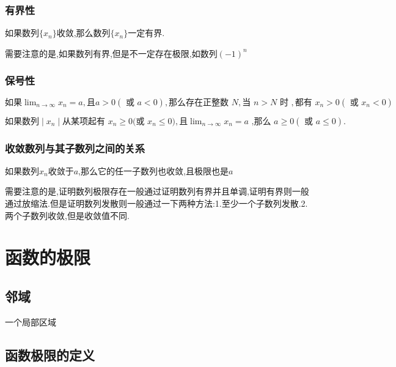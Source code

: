 \documentclass[12pt, a4paper, oneside, UTF8]{ctexbook}  %
\begin{document}
\subsubsection{有界性}
\begin{them}{}{}
    如果数列$\{x_n\}$收敛,那么数列$\{x_n\}$一定有界.
\end{them}
\begin{criterion}{}{}
    需要注意的是,如果数列有界,但是不一定存在极限,如数列$(-1)^n$
\end{criterion}
\subsubsection{保号性}
\begin{them}{}{}
    $\text{如果}\lim_{n\to\infty}x_n=a,\text{且}a{>}0(\text{ 或 }a{<}0),\text{那么存在正整数 }N,\text{当 }n{>}N\text{ 时 },\text{都有 }x_n{>}0\left(\text{ 或 }x_n{<}0\right)$
\end{them}
\begin{corollary}{}{}
    $\text{如果数列}\mid x_n\mid\text{从某项起有 }x_n\geqslant0\text{(或 }x_n\leqslant0\text{)},\text{且}\lim_{n\to\infty}x_n=a\text{ ,那么 }a\geqslant0(\text{ 或 }a\leqslant0).$
\end{corollary}
\subsubsection{收敛数列与其子数列之间的关系}
如果数列${x_n}$收敛于$a$,那么它的任一子数列也收敛,且极限也是$a$
\begin{criterion}{}{}
    需要注意的是,证明数列极限存在一般通过证明数列有界并且单调,证明有界则一般通过放缩法.但是证明数列发散则一般通过一下两种方法:1.至少一个子数列发散.2.两个子数列收敛,但是收敛值不同.
\end{criterion}
\section{函数的极限}

\subsection{邻域}
一个局部区域
\subsection{函数极限的定义}
\end{document}
